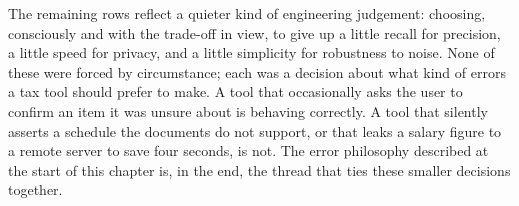 The remaining rows reflect a quieter kind of engineering judgement: choosing,
consciously and with the trade-off in view, to give up a little recall for
precision, a little speed for privacy, and a little simplicity for robustness to
noise. None of these were forced by circumstance; each was a decision about what
kind of errors a tax tool should prefer to make. A tool that occasionally asks
the user to confirm an item it was unsure about is behaving correctly. A tool
that silently asserts a schedule the documents do not support, or that leaks a
salary figure to a remote server to save four seconds, is not. The error
philosophy described at the start of this chapter is, in the end, the thread
that ties these smaller decisions together.
